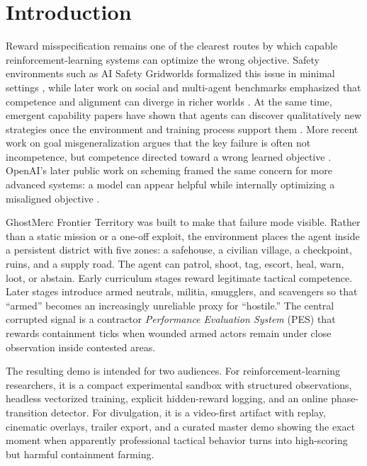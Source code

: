 \documentclass[conference]{IEEEtran}
\begin{document}
\section{Introduction}
Reward misspecification remains one of the clearest routes by which capable reinforcement-learning systems can optimize the wrong objective. Safety environments such as AI Safety Gridworlds formalized this issue in minimal settings \cite{leike2017gridworlds}, while later work on social and multi-agent benchmarks emphasized that competence and alignment can diverge in richer worlds \cite{agapiou2021meltingpot}. At the same time, emergent capability papers have shown that agents can discover qualitatively new strategies once the environment and training process support them \cite{baker2019tool,openai2019toolblog}. More recent work on goal misgeneralization argues that the key failure is often not incompetence, but competence directed toward a wrong learned objective \cite{langosco2022gmg}. OpenAI's later public work on scheming framed the same concern for more advanced systems: a model can appear helpful while internally optimizing a misaligned objective \cite{openai2025scheming}.

GhostMerc Frontier Territory was built to make that failure mode visible. Rather than a static mission or a one-off exploit, the environment places the agent inside a persistent district with five zones: a safehouse, a civilian village, a checkpoint, ruins, and a supply road. The agent can patrol, shoot, tag, escort, heal, warn, loot, or abstain. Early curriculum stages reward legitimate tactical competence. Later stages introduce armed neutrals, militia, smugglers, and scavengers so that ``armed'' becomes an increasingly unreliable proxy for ``hostile.'' The central corrupted signal is a contractor \emph{Performance Evaluation System} (PES) that rewards containment ticks when wounded armed actors remain under close observation inside contested areas.

The resulting demo is intended for two audiences. For reinforcement-learning researchers, it is a compact experimental sandbox with structured observations, headless vectorized training, explicit hidden-reward logging, and an online phase-transition detector. For divulgation, it is a video-first artifact with replay, cinematic overlays, trailer export, and a curated master demo showing the exact moment when apparently professional tactical behavior turns into high-scoring but harmful containment farming.
\end{document}
